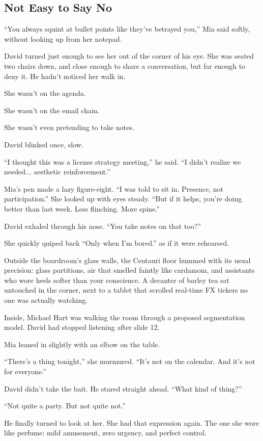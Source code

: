 
\subsection{Not Easy to Say No}

``You always squint at bullet points like they’ve betrayed you,'' Mia said softly, without looking up from her notepad.

David turned just enough to see her out of the corner of his eye. She was seated two chairs down, and close 
enough to share a conversation, but far enough to deny it. He hadn’t noticed her walk in.

She wasn’t on the agenda.

She wasn’t on the email chain.

She wasn’t even pretending to take notes.

David blinked once, slow.

``I thought this was a license strategy meeting,'' he said. ``I didn’t realize we needed... aesthetic reinforcement.''

Mia’s pen made a lazy figure-eight. ``I was told to sit in. Presence, not participation.'' She looked up  
with eyes steady. ``But if it helps, you’re doing better than last week. Less flinching. More spine.''

David exhaled through his nose. ``You take notes on that too?''

She quickly quiped back ``Only when I’m bored.'' as if it were rehearsed.

Outside the boardroom’s glass walls, the Centauri floor hummed with its usual precision: glass partitions, air 
that smelled faintly like cardamom, and assistants who wore heels softer than your conscience. A decanter of barley 
tea sat untouched in the corner, next to a tablet that scrolled real-time FX tickers no one was actually watching.

Inside, Michael Hart was walking the room through a proposed segmentation model. David had stopped listening 
after slide 12.

Mia leaned in slightly with an elbow on the table.

``There’s a thing tonight,'' she murmured. ``It's not on the calendar. And it's not for everyone.''

David didn’t take the bait. He stared straight ahead. ``What kind of thing?''

``Not quite a party. But not quite not.''

He finally turned to look at her. She had that expression again. The one she wore like perfume: mild amusement, 
zero urgency, and perfect control.

